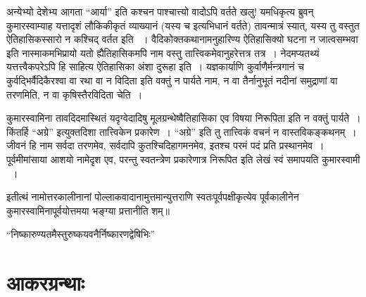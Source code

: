 अन्येभ्यो देशेभ्य आगता “आर्या” इति कश्चन पाश्चात्त्यो वादोऽपि वर्तते खलु! यमधिकृत्य ब्रुवन् कुमारस्वाम्याह यत्तादृशं लौकिकीकृतं व्याख्यानं (यस्य च  इत्यभिधानं वर्तते) तावन्मात्रं स्यात्, यस्य तु वस्तुत ऐतिहासिकस्सारो न कश्चिद् वर्तत इति ~। वैदिकोक्तकथानामनुहारिण्य ऐतिहासिक्यो घटना न जात्वसम्भवा इति नास्माकमभिप्रायो यतो ह्यैतिहासिकमपि नाम वस्तु तात्त्विकमेवानुहरेत्तत्र तत्र~। नेदमप्यतथ्यं यत्तत्त्वैकपरेऽपि हि साहित्य ऐतिहासिका अंशा दुरूहा इति~। यज्ञकार्याणि कुर्वाणैर्मन्त्रगानं च कुर्वद्भिर्वैदिकैरश्वा वा रथा वा न विदिता इति वक्तुं न पार्यते नाम, न वा तैर्नानुभूतं नदीनां समुद्राणां वा तरणमिति, न वा कृषिस्तैरविदिता चेति~।

कुमारस्वामिना तावदिदमास्थितं यदृग्वेदादिषु मूलग्रन्थेष्वैतिहासिका एव विषया निरूपिता इति न वक्तुं पार्यते~। किंतर्हि “अग्रे” इत्युक्तदिशा तात्त्विकेन प्रकारेण~। “अग्रे” इति तु तात्त्विकं वचनं न वास्तविकङ्कथनम्~। जीवनं हि नाम सर्वदा तरणमेव, सर्वदापि कुतश्चिदिहागमनमेव, इतश्च परमं पदं प्रति प्रस्थानमेव~। पूर्वमीमांसाया आशयो नामेदृश एव, परन्तु स्वतन्त्रेण प्रकारेणात्र निरूपित इति लेखं स्वं समापयति कुमारस्वामी ~।

इतीत्थं नामोत्तरकालीनानां पोल्लाकवादानामुत्तमान्युत्तराणि स्वतःपूर्वपक्षीकृत्येव पूर्वकालीनेन कुमारस्वामिनापूर्वयोत्तमया भङ्ग्या प्रत्तानीति शम्॥

\begin{center}
“निष्कारुण्यतमैस्तुरुष्कयवनैर्निष्कारणद्वेषिभिः”
\end{center}


\section*{आकरग्रन्थाः}

\retainauthsanskrit

